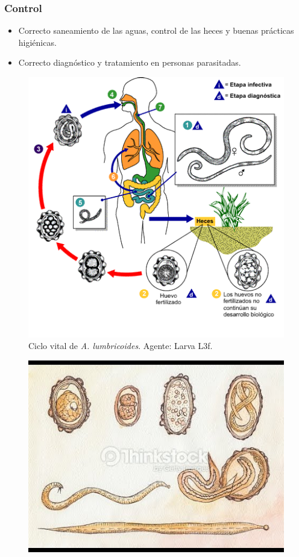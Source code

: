 \subsubsection{Control}
\begin{itemize}[itemsep=0pt,parsep=0pt,topsep=0pt,partopsep=0pt]
	\item Correcto saneamiento de las aguas, control de las heces y buenas prácticas higiénicas.
	\item Correcto diagnóstico y tratamiento en personas parasitadas.
\end{itemize}
\begin{multicols}{2}
	\begin{figure}[H]
		\centering
		\includegraphics[width=0.9\columnwidth]{A.imagenes/ACV-BioSan-Parasit-ALumbricoidesCBios}
		\caption[Ciclo vital de \textit{A. lumbricoides}]{Ciclo vital de \textit{A. lumbricoides}. Agente: Larva L3f.\label{fig:PARASIT:AlumbricoidesCBios}}
	\end{figure}
	\columnbreak
	\begin{figure}[H]
		\centering
		\includegraphics[trim=0 0.5cm 0 0.5cm,clip,width=\columnwidth]{A.imagenes/ACV-BioSan-Parasit-ALumbricoidesMorf}

\end{figure}
\end{multicols}

